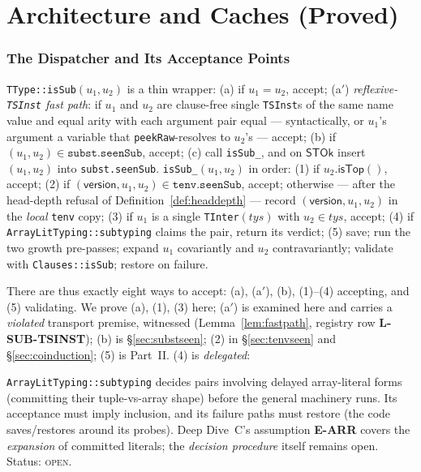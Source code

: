 \documentclass[11pt]{article}
\newcommand{\STOk}{\mathsf{STOk}}
\newcommand{\ver}{\mathsf{version}}
\begin{document}
\part{Architecture and Caches (Proved)}

\section{The Dispatcher and Its Acceptance Points}
\label{sec:dispatch}

\begin{definition}[Dispatch]
\label{def:dispatch}
\texttt{TType::isSub}$(u_1,u_2)$ is a thin wrapper: (a) if $u_1 = u_2$,
accept; (a$'$) \emph{reflexive-\texttt{TSInst} fast path}: if $u_1$ and
$u_2$ are clause-free single \texttt{TSInst}s of the same name value and
equal arity with each argument pair equal --- syntactically, or $u_1$'s
argument a variable that \texttt{peekRaw}-resolves to $u_2$'s --- accept;
(b) if $(u_1,u_2) \in \texttt{subst.seenSub}$, accept; (c) call
\texttt{isSub\_}, and on $\STOk$ insert $(u_1,u_2)$ into
\texttt{subst.seenSub}. \texttt{isSub\_}$(u_1,u_2)$ in order:
(1) if $u_2.\mathsf{isTop}()$, accept;
(2) if $(\ver, u_1, u_2) \in \texttt{tenv.seenSub}$, accept; otherwise
    --- after the head-depth refusal of
    Definition~\ref{def:headdepth} --- record $(\ver, u_1, u_2)$ in the
    \emph{local} \texttt{tenv} copy;
(3) if $u_1$ is a single \texttt{TInter}$(\mathit{tys})$ with
    $u_2 \in \mathit{tys}$, accept;
(4) if \texttt{ArrayLitTyping::subtyping} claims the pair, return its
    verdict;
(5) save; run the two growth pre-passes; expand $u_1$ covariantly and
    $u_2$ contravariantly; validate with \texttt{Clauses::isSub};
    restore on failure.
\end{definition}

There are thus exactly eight ways to accept: (a), (a$'$), (b), (1)--(4)
accepting, and (5) validating. We prove (a), (1), (3) here; (a$'$) is
examined here and carries a \emph{violated} transport premise, witnessed
(Lemma~\ref{lem:fastpath}, registry row \textbf{L-SUB-TSINST}); (b) is
\S\ref{sec:substseen}; (2) in \S\ref{sec:tenvseen} and
\S\ref{sec:coinduction}; (5) is Part~II. (4) is \emph{delegated}:

\begin{obligation}
\label{obl:arraylit}
\texttt{ArrayLitTyping::subtyping} decides pairs involving delayed
array-literal forms (committing their tuple-vs-array shape) before the
general machinery runs. Its acceptance must imply inclusion, and its
failure paths must restore (the code saves/restores around its probes).
Deep Dive~C's assumption \textbf{E-ARR} covers the \emph{expansion} of
committed literals; the \emph{decision procedure} itself remains open.
Status: \textsc{open}.
\end{obligation}
\end{document}
